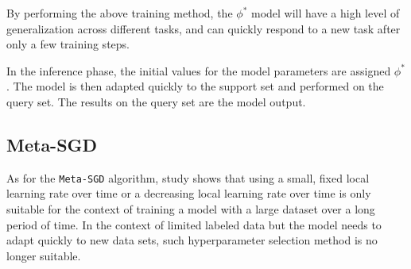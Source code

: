 By performing the above training method, the $\phi^*$ model will have a high level of generalization across different tasks, and can quickly respond to a new task after only a few training steps.


In the inference phase, the initial values for the model parameters are assigned $\phi^*$. The model is then adapted quickly to the support set and performed on the query set. The results on the query set are the model output.

\subsection{Meta-SGD}


As for the \verb|Meta-SGD| algorithm, study \cite{li2017meta} shows that using a small, fixed local learning rate over time or a decreasing local learning rate over time is only suitable for the context of training a model with a large dataset over a long period of time. In the context of limited labeled data but the model needs to adapt quickly to new data sets, such hyperparameter selection method is no longer suitable.


